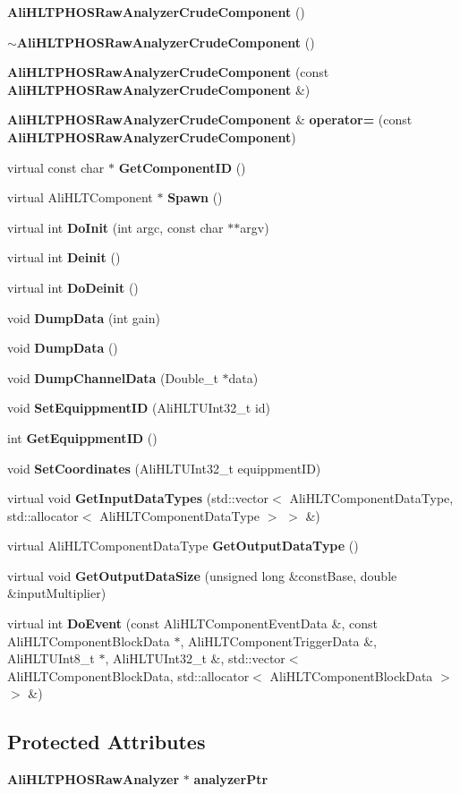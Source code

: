 \begin{CompactItemize}
\item 
{\bf Ali\-HLTPHOSRaw\-Analyzer\-Crude\-Component} ()
\item 
{\bf $\sim$Ali\-HLTPHOSRaw\-Analyzer\-Crude\-Component} ()
\item 
{\bf Ali\-HLTPHOSRaw\-Analyzer\-Crude\-Component} (const {\bf Ali\-HLTPHOSRaw\-Analyzer\-Crude\-Component} \&)
\item 
{\bf Ali\-HLTPHOSRaw\-Analyzer\-Crude\-Component} \& {\bf operator=} (const {\bf Ali\-HLTPHOSRaw\-Analyzer\-Crude\-Component})
\item 
virtual const char $\ast$ {\bf Get\-Component\-ID} ()
\item 
virtual Ali\-HLTComponent $\ast$ {\bf Spawn} ()
\item 
virtual int {\bf Do\-Init} (int argc, const char $\ast$$\ast$argv)
\item 
virtual int {\bf Deinit} ()
\item 
virtual int {\bf Do\-Deinit} ()
\item 
void {\bf Dump\-Data} (int gain)
\item 
void {\bf Dump\-Data} ()
\item 
void {\bf Dump\-Channel\-Data} (Double\_\-t $\ast$data)
\item 
void {\bf Set\-Equippment\-ID} (Ali\-HLTUInt32\_\-t id)
\item 
int {\bf Get\-Equippment\-ID} ()
\item 
void {\bf Set\-Coordinates} (Ali\-HLTUInt32\_\-t equippment\-ID)
\item 
virtual void {\bf Get\-Input\-Data\-Types} (std::vector$<$ Ali\-HLTComponent\-Data\-Type, std::allocator$<$ Ali\-HLTComponent\-Data\-Type $>$ $>$ \&)
\item 
virtual Ali\-HLTComponent\-Data\-Type {\bf Get\-Output\-Data\-Type} ()
\item 
virtual void {\bf Get\-Output\-Data\-Size} (unsigned long \&const\-Base, double \&input\-Multiplier)
\item 
virtual int {\bf Do\-Event} (const Ali\-HLTComponent\-Event\-Data \&, const Ali\-HLTComponent\-Block\-Data $\ast$, Ali\-HLTComponent\-Trigger\-Data \&, Ali\-HLTUInt8\_\-t $\ast$, Ali\-HLTUInt32\_\-t \&, std::vector$<$ Ali\-HLTComponent\-Block\-Data, std::allocator$<$ Ali\-HLTComponent\-Block\-Data $>$ $>$ \&)
\end{CompactItemize}
\subsection*{Protected Attributes}
\begin{CompactItemize}
\item 
{\bf Ali\-HLTPHOSRaw\-Analyzer} $\ast$ {\bf analyzer\-Ptr}
\end{CompactItemize}


